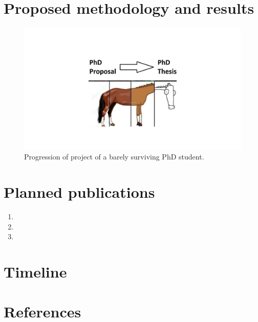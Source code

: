 \documentclass[12pt]{article}
\numberwithin{equation}{section}
\begin{document}
\blindtext


\newpage
\section{Proposed methodology and results}

\blindtext

\begin{figure}[ht]
\begin{center}
    \includegraphics[width=12.5cm, trim={9cm 3cm 9cm 4cm},clip,page=1] {proposal_figures.pdf}
    \caption{Progression of project of a barely surviving PhD student.}
    \label{fig:proposal-plan}
\end{center}
\end{figure}


\newpage
\section{Planned publications}

\begin{enumerate} [leftmargin=0.75cm,itemsep=0pt]
    \item %
    \item %
    \item %
    
\end{enumerate}



\newpage
\section{Timeline}

\blindtext






\newpage
\section*{References}
\end{document}

